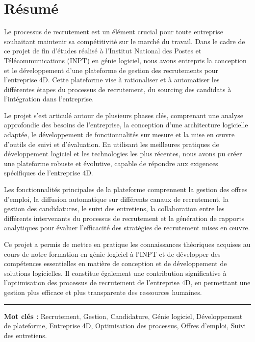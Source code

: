 \chapter*{Résumé}

\hspace{0.6cm}Le processus de recrutement est un élément crucial pour toute entreprise souhaitant maintenir sa compétitivité sur le marché du travail. Dans le cadre de ce projet de fin d'études réalisé à l'Institut National des Postes et Télécommunications (INPT) en génie logiciel, nous avons entrepris la conception et le développement d'une plateforme de gestion des recrutements pour l'entreprise 4D. Cette plateforme vise à rationaliser et à automatiser les différentes étapes du processus de recrutement, du sourcing des candidats à l'intégration dans l'entreprise.
\newline

Le projet s'est articulé autour de plusieurs phases clés, comprenant une analyse approfondie des besoins de l'entreprise, la conception d'une architecture logicielle adaptée, le développement de fonctionnalités sur mesure et la mise en œuvre d'outils de suivi et d'évaluation. En utilisant les meilleures pratiques de développement logiciel et les technologies les plus récentes, nous avons pu créer une plateforme robuste et évolutive, capable de répondre aux exigences spécifiques de l'entreprise 4D.
\newline

Les fonctionnalités principales de la plateforme comprennent la gestion des offres d'emploi, la diffusion automatique sur différents canaux de recrutement, la gestion des candidatures, le suivi des entretiens, la collaboration entre les différents intervenants du processus de recrutement et la génération de rapports analytiques pour évaluer l'efficacité des stratégies de recrutement mises en œuvre.
\newline

Ce projet a permis de mettre en pratique les connaissances théoriques acquises au cours de notre formation en génie logiciel à l'INPT et de développer des compétences essentielles en matière de conception et de développement de solutions logicielles. Il constitue également une contribution significative à l'optimisation des processus de recrutement de l'entreprise 4D, en permettant une gestion plus efficace et plus transparente des ressources humaines.
\newline

\vspace{1cm}
\noindent\rule[2pt]{\textwidth}{0.5pt}
\textbf{Mot clés :} Recrutement, Gestion, Candidature, Génie logiciel, Développement de plateforme, Entreprise 4D, Optimisation des processus, Offres d'emploi, Suivi des entretiens.




